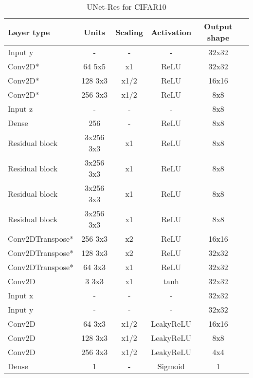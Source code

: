 \begin{table*}[h]
	\centering
	\begin{tabular}{|l|c|c|c|c|c|}
		\hline
		Layer type & Units & Scaling & Activation & Output shape\\
		\hline
		Input y & - & - & - & 32x32\\
		Conv2D* & 64 5x5 & x1 & ReLU & 32x32 \\
		Conv2D* & 128 3x3 & x1/2 & ReLU & 16x16 \\
		Conv2D* & 256 3x3 & x1/2 & ReLU & 8x8 \\
		Input z & - & - & - & 8x8\\
		Dense & 256 & - & ReLU & 8x8\\
		Residual block & 3x256 3x3 & x1 & ReLU & 8x8 \\
		Residual block & 3x256 3x3 & x1 & ReLU & 8x8 \\
		Residual block & 3x256 3x3 & x1 & ReLU & 8x8 \\
		Residual block & 3x256 3x3 & x1 & ReLU & 8x8 \\
		Conv2DTranspose* & 256 3x3 & x2 & ReLU & 16x16 \\
		Conv2DTranspose* & 128 3x3 & x2 & ReLU & 32x32 \\
		Conv2DTranspose* & 64 3x3 & x1 & ReLU & 32x32 \\
		Conv2D & 3 3x3 & x1 & tanh & 32x32 \\
		\hline
		Input x & - & - & - & 32x32\\
		Input y & - & - & - & 32x32\\
		Conv2D & 64 3x3 & x1/2 & LeakyReLU & 16x16 \\
		Conv2D & 128 3x3 & x1/2 & LeakyReLU & 8x8 \\
		Conv2D & 256 3x3 & x1/2 & LeakyReLU & 4x4 \\
		Dense & 1 & - & Sigmoid & 1\\
		\hline
	\end{tabular}
\label{subsec:Unet-Cifar}
	\caption{UNet-Res for CIFAR10} 
	
\end{table*}

